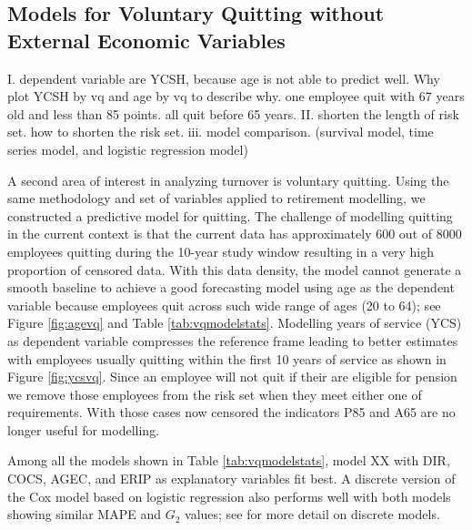 \documentclass[12pt,letterpaper]{article}
\begin{document}
\subsection{Models for Voluntary Quitting without External Economic Variables}

I. dependent variable are YCSH, because age is not able to predict well. Why plot YCSH by vq and age by vq to describe why.
one employee quit with 67 years old and less than 85 points. all quit before 65 years.
II. shorten the length of risk set. how to shorten the risk set.
iii. model comparison. (survival model, time series model, and logistic regression model)

A second area of interest in analyzing turnover is voluntary quitting.  Using the same methodology and set of variables applied to retirement modelling, we constructed a predictive model for quitting. The challenge of modelling quitting in the current context is that the current data has approximately 600 out of 8000 employees quitting during the 10-year study window resulting in a very high proportion of censored data.  With this data density, the model cannot generate a smooth baseline to achieve a good forecasting model using age as the dependent variable because employees quit across such wide range of ages (20 to 64); see Figure \ref{fig:agevq} and Table \ref{tab:vqmodelstats}.  Modelling years of service (YCS) as dependent variable compresses the reference frame leading to better estimates with employees usually quitting within the first 10 years of service as shown in Figure \ref{fig:ycsvq}. Since an employee will not quit if their are eligible for pension we remove those employees from the risk set when they meet either one of requirements.  With those cases now censored the indicators P85 and A65 are no longer useful for modelling.

Among all the models shown in Table \ref{tab:vqmodelstats}, model XX with DIR, COCS, AGEC, and ERIP as explanatory variables fit best.  A discrete version of the Cox model based on logistic regression also performs well with both models showing similar MAPE and $G_2$ values; see \citet{allison2010} for more detail on discrete models.
\end{document}
